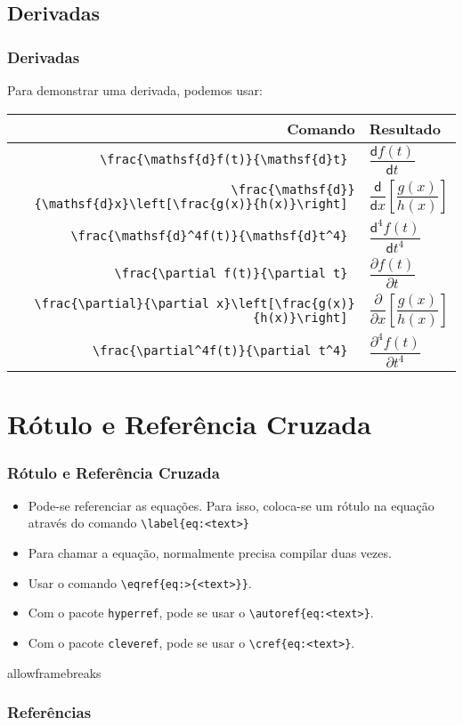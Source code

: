 \documentclass[brazilian]{beamer}
\begin{document}
\subsection{Derivadas}
\begin{frame}[fragile]
    \frametitle{Derivadas}
    Para demonstrar uma derivada, podemos usar:
    \tiny
    \renewcommand{\arraystretch}{3}
\begin{table}[h]
    \begin{tabular}{rl}
        Comando & Resultado \\ \hline
        \lstinline[style=myStyleLatex]! \frac{\mathsf{d}f(t)}{\mathsf{d}t} ! & \(\dfrac{\mathsf{d}f(t)}{\mathsf{d}t}\) \\ \hline
        \lstinline[style=myStyleLatex]! \frac{\mathsf{d}}{\mathsf{d}x}\left[\frac{g(x)}{h(x)}\right] ! & \(\dfrac{\mathsf{d}}{\mathsf{d}x}\left[ \dfrac{g(x)}{h(x)} \right]\) \\ \hline
        \lstinline[style=myStyleLatex]! \frac{\mathsf{d}^4f(t)}{\mathsf{d}t^4} ! & \(\dfrac{\mathsf{d}^4f(t)}{\mathsf{d}t^4}\) \\ \hline
        \lstinline[style=myStyleLatex]! \frac{\partial f(t)}{\partial t} ! & \(\dfrac{\partial f(t)}{\partial t}\) \\ \hline
        \lstinline[style=myStyleLatex]! \frac{\partial}{\partial x}\left[\frac{g(x)}{h(x)}\right] ! & \(\dfrac{\partial}{\partial x}\left[ \dfrac{g(x)}{h(x)} \right]\) \\ \hline
        \lstinline[style=myStyleLatex]! \frac{\partial^4f(t)}{\partial t^4} ! & \(\dfrac{\partial^4f(t)}{\partial t^4}\) \\ \hline
    \end{tabular}
\end{table}

\end{frame}

\section{Rótulo e Referência Cruzada}
\begin{frame}[fragile]
    \frametitle{Rótulo e Referência Cruzada}

    \begin{itemize}
        \item Pode-se referenciar as equações. Para isso, coloca-se um rótulo na equação através do comando \lstinline[style=myStyleLatex]!\label{eq:<text>}!
        \item Para chamar a equação, normalmente precisa compilar duas vezes. 
        \item Usar o comando \lstinline[style=myStyleLatex]!\eqref{eq:>{<text>}}!. 
        \item Com o pacote \texttt{hyperref}, pode se usar o \lstinline[style=myStyleLatex]!\autoref{eq:<text>}!.
        \item Com o pacote \texttt{cleveref}, pode se usar o \lstinline[style=myStyleLatex]!\cref{eq:<text>}!.
    \end{itemize}

\end{frame}


\begin{frame}{allowframebreaks}
    \frametitle{Referências}
    \nocite{*}
    \printbibliography[keyword={inserirEquacoes}]
\end{frame}
\end{document}
